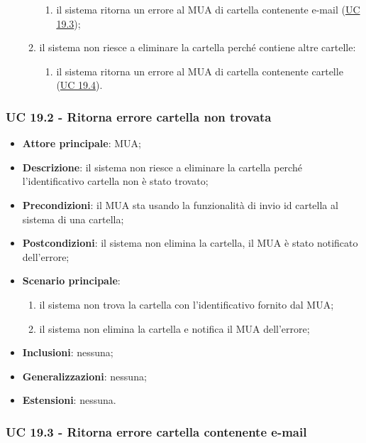 \begin{itemize}
\begin{enumerate}[label=\alph*.]
\begin{enumerate}[label=\arabic*.]
                    \item il sistema ritorna un errore al MUA di cartella contenente e-mail (\hyperref[sec:UC19.3]{UC 19.3});
                \end{enumerate}
                \item il sistema non riesce a eliminare la cartella perché contiene altre cartelle:
                \begin{enumerate}[label=\arabic*.]
                    \item il sistema ritorna un errore al MUA di cartella contenente cartelle (\hyperref[sec:UC19.4]{UC 19.4}).
                \end{enumerate}
            \end{enumerate}
    \end{itemize}


\subsubsection{UC 19.2 - Ritorna errore cartella non trovata} \label{sec:UC19.2}
    \begin{itemize}
        \item \textbf{Attore principale}: MUA;
        \item \textbf{Descrizione}: il sistema non riesce a eliminare la cartella perché l'identificativo cartella non è stato trovato;
        \item \textbf{Precondizioni}: il MUA sta usando la funzionalità di invio id cartella al sistema di una cartella;
        \item \textbf{Postcondizioni}: il sistema non elimina la cartella, il MUA è stato notificato dell'errore;
        \item \textbf{Scenario principale}:
            \begin{enumerate}
                \item il sistema non trova la cartella con l'identificativo fornito dal MUA;
                \item il sistema non elimina la cartella e notifica il MUA dell'errore;
            \end{enumerate}
        \item \textbf{Inclusioni}: nessuna;
        \item \textbf{Generalizzazioni}: nessuna;
        \item \textbf{Estensioni}: nessuna.
    \end{itemize}
   
    \subsubsection{UC 19.3 - Ritorna errore cartella contenente e-mail} \label{sec:UC19.3}

